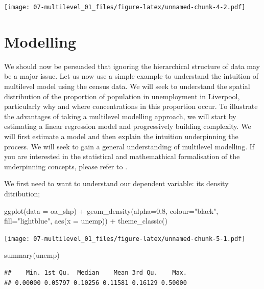 \documentclass[
]{book}
\newenvironment{Shaded}{\begin{snugshade}}{\end{snugshade}}
\newcommand{\AttributeTok}[1]{\textcolor[rgb]{0.77,0.63,0.00}{#1}}
\newcommand{\FloatTok}[1]{\textcolor[rgb]{0.00,0.00,0.81}{#1}}
\newcommand{\FunctionTok}[1]{\textcolor[rgb]{0.00,0.00,0.00}{#1}}
\newcommand{\NormalTok}[1]{#1}
\newcommand{\SpecialCharTok}[1]{\textcolor[rgb]{0.00,0.00,0.00}{#1}}
\newcommand{\StringTok}[1]{\textcolor[rgb]{0.31,0.60,0.02}{#1}}
\begin{document}
\texttt{[image: 07-multilevel\_01\_files/figure-latex/unnamed-chunk-4-2.pdf]}

\hypertarget{modelling}{%
\section{Modelling}\label{modelling}}

We should now be persuaded that ignoring the hierarchical structure of data may be a major issue. Let us now use a simple example to understand the intuition of multilevel model using the census data. We will seek to understand the spatial distribution of the proportion of population in unemployment in Liverpool, particularly why and where concentrations in this proportion occur. To illustrate the advantages of taking a multilevel modelling approach, we will start by estimating a linear regression model and progressively building complexity. We will first estimate a model and then explain the intuition underpinning the process. We will seek to gain a general understanding of multilevel modelling. If you are interested in the statistical and mathemathical formalisation of the underpinning concepts, please refer to \citet{Gelman_Hill_2006_book}.

We first need to want to understand our dependent variable: its density ditribution;

\begin{Shaded}
\begin{Highlighting}[]
\FunctionTok{ggplot}\NormalTok{(}\AttributeTok{data =}\NormalTok{ oa\_shp) }\SpecialCharTok{+}
\FunctionTok{geom\_density}\NormalTok{(}\AttributeTok{alpha=}\FloatTok{0.8}\NormalTok{, }\AttributeTok{colour=}\StringTok{"black"}\NormalTok{, }\AttributeTok{fill=}\StringTok{"lightblue"}\NormalTok{, }\FunctionTok{aes}\NormalTok{(}\AttributeTok{x =}\NormalTok{ unemp)) }\SpecialCharTok{+}
   \FunctionTok{theme\_classic}\NormalTok{()}
\end{Highlighting}
\end{Shaded}

\texttt{[image: 07-multilevel\_01\_files/figure-latex/unnamed-chunk-5-1.pdf]}

\begin{Shaded}
\begin{Highlighting}[]
\FunctionTok{summary}\NormalTok{(unemp)}
\end{Highlighting}
\end{Shaded}

\begin{verbatim}
##    Min. 1st Qu.  Median    Mean 3rd Qu.    Max. 
## 0.00000 0.05797 0.10256 0.11581 0.16129 0.50000
\end{verbatim}
\end{document}
